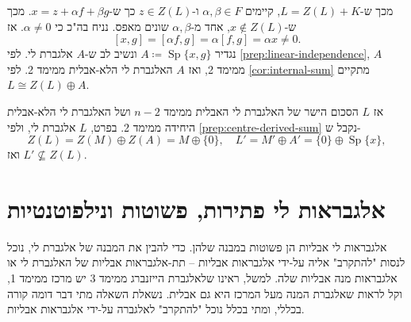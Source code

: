\documentclass{report}
\theoremstyle{break}
\theoremstyle{MyNonumberbreak}
\DeclareMathOperator{\Sp}{Sp}
\begin{document}
\begin{itemize}
	מכך ש-$L = Z(L) + K$, קיימים $\alpha, \beta \in F$ ו-$z \in Z(L)$ כך ש-$x = z + \alpha f + \beta g$. מכך ש-$x \notin Z(L)$, אחד מ-$\alpha, \beta$ שונים מאפס. נניח בה"כ כי $\alpha \neq 0$. אז
	\[ [x, g] = [\alpha f, g] = \alpha [f, g] = \alpha x \neq 0. \]
	נגדיר $A \coloneq \Sp\{x, g\}$ ונשיב לב ש-$A$ אלגברת לי. לפי \autoref*{prep:linear-independence}, $A$ ממימד 2, ואז $A$ האלגברת לי הלא-אבלית ממימד 2. לפי \autoref*{cor:internal-sum} מתקיים $L \cong Z(L) \oplus A$.
	
	אז $L$ הסכום הישר של האלגברת לי האבלית ממימד $n-2$ ושל האלגברת לי הלא-אבלית היחידה ממימד 2. בפרט, $L$ אלגברת לי, ולפי \autoref*{prep:centre-derived-sum} נקבל ש-
	\[ Z(L) = Z(M) \oplus Z(A) = M \oplus \{0\}, \quad L' = M' \oplus A' = \{0\} \oplus \Sp\{x\}, \]
	ואז $L' \not\subseteq Z(L)$.
	\begin{comment}
	יהי $K$ המשלים הישר של $Z(L) + L'$, ואז $L = (Z(L) + L') + K$. קיים ל-$K$ בסיס מהצורה $\{z_1, \ldots, z_m, f_1, g_1, \ldots, f_r, g_r\}$ כמו בלמה. אם $r > 0$ אז לפי (III) מתקיים
	\[ [z_1, x] = [z_1, [f_1, g_1]] = -[f_1, [g_1, z_1]] - [g_1, [z_1, f_1]] = -[f_1, 0] - [g_1, 0] = 0. \]
	אבל אז, מכך ש-$[z_1, y] = 0$ לכל $y \in K$ ו-$[z_1, z] = 0$ לכל $z \in Z(L)$, נקבל ש-$z_1 \in Z(L)$, בסתירה לכך ש-$z_1 \in K$ ו-$K$ משלים ישר של $Z(L) + L'$. לכן $r = 0$ וקיים ל-$K$ בסיס מהצורה $\{z_1, z_2, \ldots, z_m\}$, ו-$K$ אלגברת לי אבלית.
	
	ראינו בהוכחה ש-$[z_1, x] \neq 0$. באופן דומה, $[z_i, x] \neq 0$ ולכן על-ידי כפל $z_i$ בסקלר שונה מאפס נוכל להניח בה"כ כי $[z_i, x] = x$.	אם $m > 1$ נגדיר $z \coloneqq z_1 - z_2$ ונקבל ש-$[z, x] = 0$. אז $z \in Z(L)$, בסתירה לכך ש-$z \in K$. לכן $m \in \{0, 1\}$. אם $m = 0$ אז $K = \emptyset$ ואז $L$ אבלית וזאת סתירה. לכן $m = 1$ ו-$[z_1, x] = x$. 
	
	נסמן $A = \Sp\{x, z_1\}$. מ\autoref*{thm:algebras-dim-2} נקבל ש-$A$ אלגברת לי. בנוסף, תהי $M$ האלגברת לי האבלית ממימד $n-2$. אז $M = Z(L)$, ו-$L = M \oplus A$. אז $L$ הסכום הישר של האלגברת לי האבלית ממימד $n-2$ ושל האלגברת לי הלא-אבלית היחידה ממימד 2. בפרט, $L$ אלגברת לי.
	\end{comment}
\end{itemize}


\chapter{אלגבראות לי פתירות, פשוטות ונילפוטנטיות}
אלגבראות לי אבליות הן פשוטות במבנה שלהן. כדי להבין את המבנה של אלגברת לי, נוכל לנסות "להתקרב" אליה על-ידי אלגבראות אבליות -- תת-אלגבראות אבליות של האלגברת לי או אלגבראות מנה אבליות שלה. למשל, ראינו שלאלגברת הייזנברג ממימד 3 יש מרכז ממימד 1, וקל לראות שאלגברת המנה מעל המרכז היא גם אבלית. נשאלת השאלה מתי דבר דומה קורה בכללי, ומתי בכלל נוכל "להתקרב" לאלגברה על-ידי אלגבראות אבליות.
\end{document}
